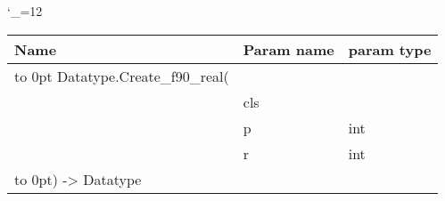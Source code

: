 \begingroup \catcode`\_=12 \tt
\begin{tabular}{lll}
\toprule
\textrm{Name}&\textrm{Param name}&\textrm{param type}\\
\midrule
\hbox to 0pt {Datatype.Create_f90_real(\hss}\\
& cls\\
& p & int\\
& r & int\\
\hbox to 0pt{) -> Datatype\hss}\\
\bottomrule
\end{tabular}
\endgroup
